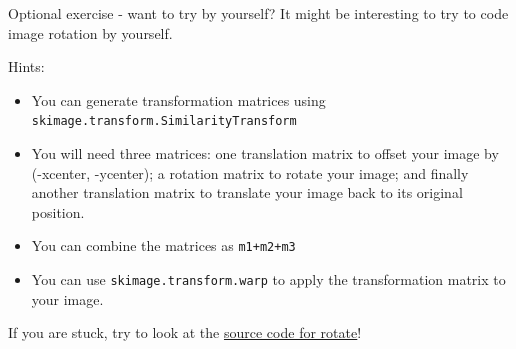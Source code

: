 \documentclass[9pt, aspectratio=169]{beamer}
\begin{document}
\begin{frame}
    {Optional exercise - want to try by yourself?}
    It might be interesting to try to code image rotation by yourself.

    Hints:

    \begin{itemize}
        \item You can generate transformation matrices using \texttt{skimage.transform.SimilarityTransform}
        \item You will need three matrices: one translation matrix to offset your image by (-xcenter, -ycenter); a rotation matrix to rotate your image; and finally another translation matrix to translate your image back to its original position.
        \item You can combine the matrices as \texttt{m1+m2+m3}
        \item You can use \texttt{skimage.transform.warp} to apply the transformation matrix to your image.
    \end{itemize}

    If you are stuck, try to look at the \href{https://github.com/scikit-image/scikit-image/blob/main/skimage/transform/\_warps.py\#L349-L460}{\underline{source code for rotate}}!
\end{frame}
\end{document}
